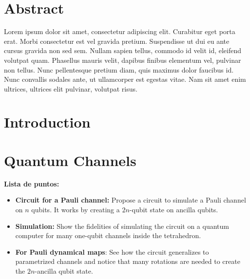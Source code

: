 \documentclass[10pt,letterpaper]{article} %
\begin{document}
\section*{Abstract}
Lorem ipsum dolor sit amet, consectetur adipiscing elit. Curabitur eget porta erat. Morbi consectetur est vel gravida pretium. Suspendisse ut dui eu ante cursus gravida non sed sem. Nullam sapien tellus, commodo id velit id, eleifend volutpat quam. Phasellus mauris velit, dapibus finibus elementum vel, pulvinar non tellus. Nunc pellentesque pretium diam, quis maximus dolor faucibus id. Nunc convallis sodales ante, ut ullamcorper est egestas vitae. Nam sit amet enim ultrices, ultrices elit pulvinar, volutpat risus.



\linenumbers

\section{Introduction} %


\section{Quantum Channels}  \label{sec: Pauli Channels} %

\textbf{Lista de puntos:}
\begin{itemize}
\item \textbf{Circuit for a Pauli channel:}  Propose a circuit to simulate a Pauli channel on $n$ qubits. It works by creating a $2n$-qubit state on ancilla qubits.
\item \textbf{Simulation:} Show the fidelities of simulating the circuit on a quantum computer for many one-qubit channels inside the tetrahedron.
\item \textbf{For Pauli dynamical maps}: See how the circuit generalizes to parametrized channels and notice that many rotations are needed to create the $2n$-ancilla qubit state. \\
\end{itemize}
\end{document}
